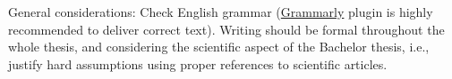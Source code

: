 General considerations: Check English grammar (\href{https://app.grammarly.com/}{Grammarly} plugin is highly recommended to deliver correct text). Writing should be formal throughout the whole thesis, and considering the scientific aspect of the Bachelor thesis, i.e., justify hard assumptions using proper references to scientific articles.
